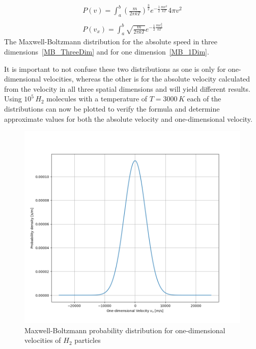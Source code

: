 \documentclass[reprint,english,notitlepage]{revtex4-2}
\begin{document}
\begin{align}
	P(v) = \int_{a}^{b} \left(\frac{m}{2\pi kT}\right)^{\frac{3}{2}} e^{-\frac{1}{2}\frac{mv^2}{kT}} 4\pi v^2 \label{MB_ThreeDim}\\
	\nonumber \\
    P(v_x) = \int_{a}^{b} \sqrt{\frac{m}{2\pi kT}} e^{-\frac{1}{2}\frac{mv_{x}^2}{kT}} \label{MB_1Dim}
\end{align}
The Maxwell-Boltzmann distribution for the absolute speed in three dimensions~\ref{MB_ThreeDim} and for one dimension~\ref{MB_1Dim}.

It is important to not confuse these two distributions as one is only for one-dimensional velocities, whereas the other is for the absolute velocity calculated from the velocity in all three spatial dimensions and will yield different results.
Using $10^5\,H_2$ molecules with a temperature of $T=3000\,K$ each of the distributions can now be plotted to verify the formula and determine approximate values for both the absolute velocity and one-dimensional velocity.
\begin{figure}[h]
	\centering
	\includegraphics[scale=0.3]{./Figures/Max-Boltz1}
	\caption{Maxwell-Boltzmann probability distribution for one-dimensional velocities of $H_{2}$ particles}\label{fig:Max_Boltz1D_Plot}
\end{figure}
\end{document}
